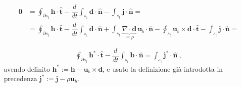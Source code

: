 \documentclass[letterpaper,10pt,italian]{jupyterBook}
\begin{document}
\sphinxAtStartPar
{}
\begin{equation*}
\begin{split}\begin{aligned}
    \mathbf{0} & = \oint_{\partial s_t} \mathbf{h} \cdot \hat{\mathbf{t}} - \dfrac{d}{dt} \int_{s_t} \mathbf{d} \cdot \hat{\mathbf{n}} - \int_{s_t} \mathbf{j} \cdot \hat{\mathbf{n}} = \\
    & = \oint_{\partial s_t} \mathbf{h} \cdot \hat{\mathbf{t}} - \dfrac{d}{dt} \int_{s_t} \mathbf{d} \cdot \hat{\mathbf{n}} + \int_{s_t} \underbrace{\nabla \cdot \mathbf{d}}_{=\rho} \, \mathbf{u}_b \cdot \hat{\mathbf{n}} - \oint_{s_t} \mathbf{u}_b \times \mathbf{d} \cdot \hat{\mathbf{t}} - \int_{s_t} \mathbf{j} \cdot \hat{\mathbf{n}} =  \\
\end{aligned}\end{split}
\end{equation*}\begin{equation*}
\begin{split}
    \oint_{\partial s_t} \mathbf{h}^* \cdot \hat{\mathbf{t}} - \dfrac{d}{dt} \int_{s_t} \mathbf{b} \cdot \hat{\mathbf{n}} = \int_{s_t} \mathbf{j}^* \cdot \hat{\mathbf{n}} \ ,
\end{split}
\end{equation*}
\sphinxAtStartPar
avendo definito \(\mathbf{h}^* := \mathbf{h} - \mathbf{u}_b \times \mathbf{d}\), e usato la definizione già introdotta in precedenza \(\mathbf{j}^* := \mathbf{j} - \rho \mathbf{u}_b\).
\end{document}
